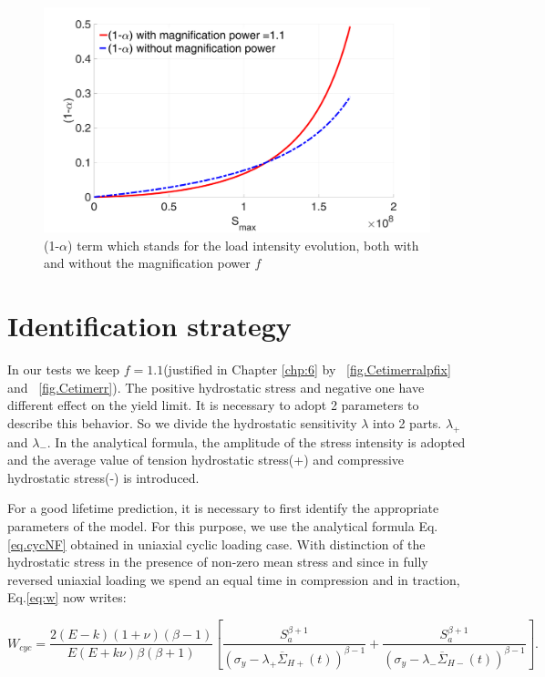 \documentclass[3p,times,procedia,number]{elsarticle}
\newcommand{\figref}[1]{\figurename~\ref{#1}}
\begin{document}
\begin{figure}[!h]
	\centering
	\includegraphics[width=\textwidth]{figures//alp_Smax_fb.png} 
	\caption{(1-$\alpha$) term which stands for the load intensity evolution, both with and without the magnification power $f$}
	\label{fig.SmaxSequence}
\end{figure}

\clearpage
\section{Identification strategy}
\label{sec:5.9}
In our tests we keep $f=1.1$(justified in Chapter \ref{chp:6} by \figref{fig.Cetimerralpfix} and \figref{fig.Cetimerr}). The positive hydrostatic stress and negative one have different effect on the yield limit. It is necessary to adopt 2 parameters to describe this behavior. So we divide the hydrostatic sensitivity $\lambda$ into 2 parts. $\lambda_+$ and $\lambda_-$. In the analytical formula, the amplitude of the stress intensity is adopted and the average value of tension hydrostatic stress(+) and compressive hydrostatic stress(-) is introduced.

For a good lifetime prediction, it is necessary to first identify the appropriate parameters of the model. For this purpose, we use the analytical formula Eq.\eqref{eq.cycNF} obtained in uniaxial cyclic loading case. With distinction of the hydrostatic stress in the presence of non-zero mean stress and since in fully reversed uniaxial loading we spend an equal time in compression and in traction, Eq.\eqref{eq:w} now writes:

\begin{equation}
W_{cyc}=\dfrac{2(E-k)(1+\nu)\left( \beta-1\right) }{ E(E+k\nu)\beta\left( \beta+1\right) }\left[ \dfrac{S_{a}^{\beta+1}}{ \left(\sigma_y-\lambda_+ \overline{\Sigma}_{H+}(t)\right)^{\beta-1}}+\dfrac{S_{a}^{\beta+1}}{ \left(\sigma_y-\lambda_- \overline{\Sigma}_{H-}(t)\right)^{\beta-1}}\right] .
\label{eq:wcycnew}
\end{equation}
\end{document}
